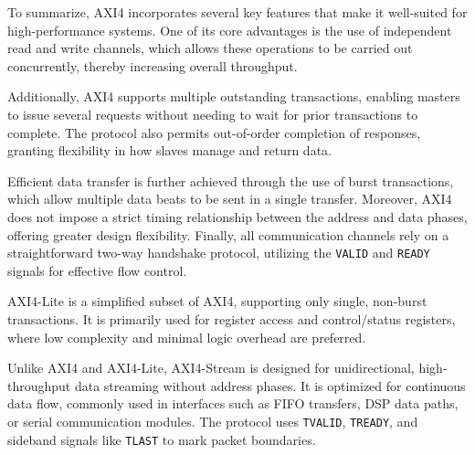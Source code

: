 To summarize, AXI4 incorporates several key features that make it well-suited for high-performance systems. One of its core advantages is the use of independent read and write channels, which allows these operations to be carried out concurrently, thereby increasing overall throughput. 

Additionally, AXI4 supports multiple outstanding transactions, enabling masters to issue several requests without needing to wait for prior transactions to complete. The protocol also permits out-of-order completion of responses, granting flexibility in how slaves manage and return data. 

Efficient data transfer is further achieved through the use of burst transactions, which allow multiple data beats to be sent in a single transfer. Moreover, AXI4 does not impose a strict timing relationship between the address and data phases, offering greater design flexibility. Finally, all communication channels rely on a straightforward two-way handshake protocol, utilizing the \texttt{VALID} and \texttt{READY} signals for effective flow control.\cite{st_micheal_introduction_2019}\cite{the_art_of_verification_understanding_2021}


AXI4-Lite is a simplified subset of AXI4, supporting only single, non-burst transactions. It is primarily used for register access and control/status registers, where low complexity and minimal logic overhead are preferred.\cite{arm_amba_2021}

Unlike AXI4 and AXI4-Lite, AXI4-Stream is designed for unidirectional, high-throughput data streaming without address phases. It is optimized for continuous data flow, commonly used in interfaces such as FIFO transfers, DSP data paths, or serial communication modules. The protocol uses \texttt{TVALID}, \texttt{TREADY}, and sideband signals like \texttt{TLAST} to mark packet boundaries.\cite{arm_amba_2021-1}

